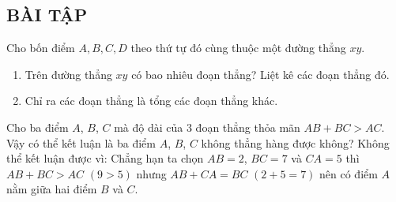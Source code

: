 \subsection{BÀI TẬP}
\begin{bt}%
	Cho bốn điểm $A,B,C,D$ theo thứ tự đó cùng thuộc một đường thẳng $xy$.
	\begin{enumerate}
		\item Trên đường thẳng $xy$ có bao nhiêu đoạn thẳng? Liệt kê các đoạn thẳng đó.
		\item Chỉ ra các đoạn thẳng là tổng các đoạn thẳng khác.
	\end{enumerate}
\end{bt}
\begin{bt}%
	Cho ba điểm $A$, $B$, $C$ mà độ dài của $3$ đoạn thẳng thỏa mãn $AB+BC>AC$. Vậy có thể kết luận là ba điểm $A$, $B$, $C$ không thẳng hàng được không?
	\loigiai
	{
		Không thể kết luận được vì: Chẳng hạn ta chọn $AB=2$, $BC=7$ và $CA=5$ thì $AB+BC>AC$ $(9>5)$ nhưng $AB+CA=BC$ $(2+5=7)$ nên có điểm $A$ nằm giữa hai điểm $B$ và $C$.
	}
\end{bt}
